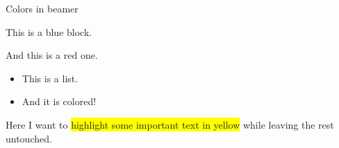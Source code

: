 
\begin{frame}{Colors in beamer}

    {\color{blue} This is a blue block.}
    
    {\color{red} And this is a red one.}
    
    \begin{itemize}
    \color{green}
        \item This is a list.
        \item And it is colored!
    \end{itemize}
    
    Here I want to \colorbox{yellow}{highlight some
    important text in yellow} while leaving the rest
    untouched.
    
\end{frame}